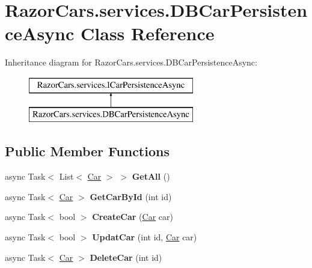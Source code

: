 \hypertarget{class_razor_cars_1_1services_1_1_d_b_car_persistence_async}{}\section{Razor\+Cars.\+services.\+D\+B\+Car\+Persistence\+Async Class Reference}
\label{class_razor_cars_1_1services_1_1_d_b_car_persistence_async}
Inheritance diagram for Razor\+Cars.\+services.\+D\+B\+Car\+Persistence\+Async\+:\begin{figure}[H]
\begin{center}
\leavevmode
\includegraphics[height=2.000000cm]{class_razor_cars_1_1services_1_1_d_b_car_persistence_async}
\end{center}
\end{figure}
\subsection*{Public Member Functions}
\begin{DoxyCompactItemize}
\item 
\mbox{\label{class_razor_cars_1_1services_1_1_d_b_car_persistence_async_a22e5e43c37b521a4ccb80004cbdd78ed}} 
async Task$<$ List$<$ \mbox{\hyperlink{class_razor_cars_1_1model_1_1_car}{Car}} $>$ $>$ {\bfseries Get\+All} ()
\item 
\mbox{\label{class_razor_cars_1_1services_1_1_d_b_car_persistence_async_a4dfc6e891ab78bc3c4b7aaeec8716c40}} 
async Task$<$ \mbox{\hyperlink{class_razor_cars_1_1model_1_1_car}{Car}} $>$ {\bfseries Get\+Car\+By\+Id} (int id)
\item 
\mbox{\label{class_razor_cars_1_1services_1_1_d_b_car_persistence_async_ad94a271f36392f0e543396413ebfa768}} 
async Task$<$ bool $>$ {\bfseries Create\+Car} (\mbox{\hyperlink{class_razor_cars_1_1model_1_1_car}{Car}} car)
\item 
\mbox{\label{class_razor_cars_1_1services_1_1_d_b_car_persistence_async_a89925d3c5a00b1e79491a1d7b1927566}} 
async Task$<$ bool $>$ {\bfseries Updat\+Car} (int id, \mbox{\hyperlink{class_razor_cars_1_1model_1_1_car}{Car}} car)
\item 
\mbox{\label{class_razor_cars_1_1services_1_1_d_b_car_persistence_async_abf3b96743374c2d15bead00f718b063b}} 
async Task$<$ \mbox{\hyperlink{class_razor_cars_1_1model_1_1_car}{Car}} $>$ {\bfseries Delete\+Car} (int id)
\end{DoxyCompactItemize}


